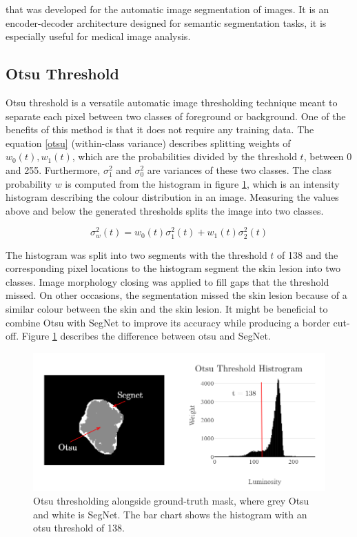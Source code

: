 that was developed for the automatic image segmentation of images. It is an encoder-decoder architecture designed for semantic segmentation tasks, it is especially useful for medical image analysis\cite{zhou2020}.  

\subsection{Otsu Threshold}
Otsu threshold is a versatile automatic image thresholding technique meant to separate each pixel between two classes of foreground or background. One of the benefits of this method is that it does not require any training data. The equation \ref{otsu} (within-class variance) describes splitting weights of $w_0(t),w_1(t)$, which are the probabilities divided by the threshold $t$, between 0 and 255. Furthermore, $\sigma_1^2$ and $\sigma_0^2$ are variances of these two classes. The class probability $w$ is computed from the histogram in figure \ref{otsu2}, which is an intensity histogram describing the colour distribution in an image. Measuring the values above and below the generated thresholds splits the image into two classes.

\begin{equation}
\sigma_w^2(t) = w_0(t)\sigma_1^2(t) + w_1(t)\sigma_2^2(t)
\end{equation}\label{otsu}

The histogram was split into two segments with the threshold $t$ of 138 and the corresponding pixel locations to the histogram segment the skin lesion into two classes. Image morphology closing was applied to fill gaps that the threshold missed. On other occasions, the segmentation missed the skin lesion because of a similar colour between the skin and the skin lesion. It might be beneficial to combine Otsu with SegNet to improve its accuracy while producing a border cut-off. Figure \ref{otsu2} describes the difference between otsu and SegNet.

\begin{figure}
\centering
\includegraphics[scale=0.7]{images/otsu3.png}
\caption{Otsu thresholding alongside ground-truth mask, where grey Otsu and white is SegNet. The bar chart shows the histogram with an otsu threshold of 138.}\label{otsu2}
\end{figure}

